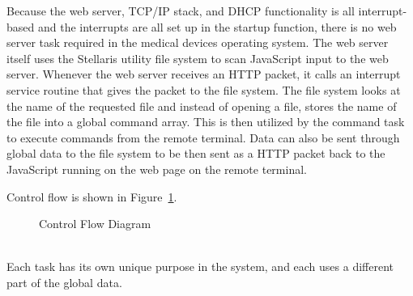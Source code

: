 \documentclass[12pt]{article} %
\begin{document}
Because the web server, TCP/IP stack, and DHCP
functionality is all interrupt-based and the interrupts are all set up in the
startup function, there is no web server task required in the
medical devices operating system. The web server itself uses the Stellaris
utility file system to scan JavaScript input to the web server. Whenever the
web server receives an HTTP packet, it calls an interrupt service routine that
gives the packet to the file system.
The file system looks at the name of the requested file and instead of opening
a file, stores the name of the file into a global command array. 
This is then utilized by the command task to execute commands from the remote
terminal. Data can also be sent through global data to the file system to be
then sent as a HTTP packet back to the JavaScript running on the web page on
the remote terminal.
    
    Control flow is shown in Figure~\ref{fig:Control}. 

    \begin{figure}[h]
      \centering
      \caption{Control Flow Diagram}
      \label{fig:Control}
    \end{figure}
~\\
    Each task has its own unique purpose in the system, and each uses a different
    part of the global data.
\end{document}
